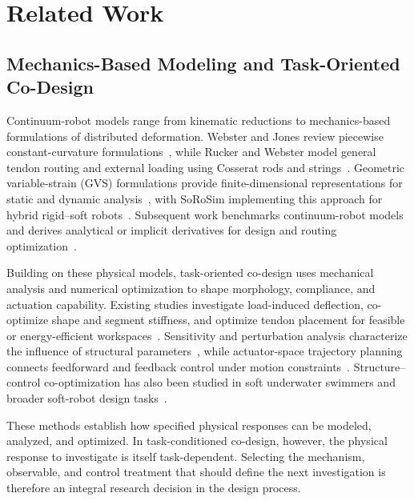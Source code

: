 \section{Related Work}
\label{sec:related}

\subsection{Mechanics-Based Modeling and Task-Oriented Co-Design}

Continuum-robot models range from kinematic reductions to mechanics-based formulations of distributed deformation. Webster and Jones review piecewise constant-curvature formulations~\cite{webster2010design}, while Rucker and Webster model general tendon routing and external loading using Cosserat rods and strings~\cite{rucker2011computing}. Geometric variable-strain (GVS) formulations provide finite-dimensional representations for static and dynamic analysis~\cite{renda2020gvs,boyer2021dynamics}, with SoRoSim implementing this approach for hybrid rigid--soft robots~\cite{mathew2023sorosim}. Subsequent work benchmarks continuum-robot models and derives analytical or implicit derivatives for design and routing optimization~\cite{rao2021modeling,mathew2026derivatives,mathew2026routing}.

Building on these physical models, task-oriented co-design uses mechanical analysis and numerical optimization to shape morphology, compliance, and actuation capability. Existing studies investigate load-induced deflection, co-optimize shape and segment stiffness, and optimize tendon placement for feasible or energy-efficient workspaces~\cite{oliverbutler2019stiffness,stella2023stiffness,jabari2026design}. Sensitivity and perturbation analysis characterize the influence of structural parameters~\cite{sawant2023stiffness,bonnans2000perturbation}, while actuator-space trajectory planning connects feedforward and feedback control under motion constraints~\cite{qiu2025actuator}. Structure--control co-optimization has also been studied in soft underwater swimmers and broader soft-robot design tasks~\cite{ma2021diffaqua,bhatia2022evolutiongym,wang2023softzoo}.

These methods establish how specified physical responses can be modeled, analyzed, and optimized. In task-conditioned co-design, however, the physical response to investigate is itself task-dependent. Selecting the mechanism, observable, and control treatment that should define the next investigation is therefore an integral research decision in the design process.


